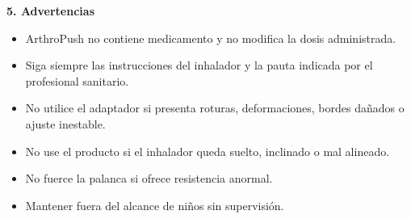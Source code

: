 \documentclass[11pt,a4paper]{article}
\begin{document}
\noindent
\begin{minipage}{\textwidth}
\setlength{\fboxsep}{10pt}
\colorbox{ArthroNavy!8}{
\begin{minipage}{0.96\textwidth}

{\large\bfseries\color{ArthroNavy} 5. Advertencias}

\vspace{0.2cm}

\begin{itemize}
    \item ArthroPush no contiene medicamento y no modifica la dosis administrada.
    \item Siga siempre las instrucciones del inhalador y la pauta indicada por el profesional sanitario.
    \item No utilice el adaptador si presenta roturas, deformaciones, bordes dañados o ajuste inestable.
    \item No use el producto si el inhalador queda suelto, inclinado o mal alineado.
    \item No fuerce la palanca si ofrece resistencia anormal.
    \item Mantener fuera del alcance de niños sin supervisión.
\end{itemize}

\end{minipage}
}
\end{minipage}

\vspace{0.45cm}
\end{document}
